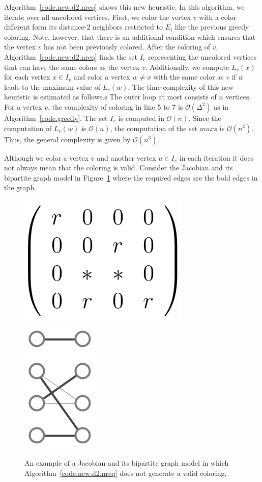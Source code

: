 \documentclass[12pt, twoside,a4paper,toc=bibliography]{scrbook}
\newcommand{\figref}[1]{Figure~\protect\ref{#1}}
\newcommand{\coderef}[1]{Algorithm~\protect\ref{#1}}
\newcommand{\nreq}{L}
\begin{document}
\coderef{code.new.d2.nreq} shows this new heuristic.
In this algorithm, we iterate over all uncolored vertices.
First, we color the vertex $v$ with a color different form
its distance-$2$ neighbors restricted to $E_i$ like the previous greedy coloring.
Note, however, that there is an additional condition which 
ensures that the vertex $v$ has not been previously colored.
After the coloring of $v$, \coderef{code.new.d2.nreq} finds the set $I_v$
representing the uncolored vertices that can have the same colors as the vertex $v$.
Additionally, we compute $\nreq_v(x)$ for each vertex $x\in I_v$
and color a vertex $w\neq x$ with the same color as $v$
if $w$ leads to the maximum value of $\nreq_v(w)$.
The time complexity of this new heuristic is estimated as follows.s
The outer loop at most consists of $n$ vertices. 
For a vertex $v$, the complexity of coloring in line 5 to 7 is $\mathcal{O}(\Delta^2)$ as 
in \coderef{code.greedy}. The set $I_v$ is computed in $\mathcal{O}(n)$.
Since the computation of $\nreq_v(w)$ is $\mathcal{O}(n)$, the computation of
the set $maxs$ is $\mathcal{O}(n^2)$. Thus, the general complexity is given by $\mathcal{O}(n^3)$.

Although we color a vertex $v$ and another vertex $u\in I_v$ in each iteration
it does not always mean that the coloring is valid. Consider the Jacobian and 
its bipartite graph model in \figref{twocolorings2} where the required edges are the bold edges in the graph.
\begin{figure}
\centering
\includegraphics[width=0.25\linewidth]{example_matrix}
\qquad
\includegraphics[width=0.12\linewidth]{example_bipartite}
\caption{An example of a Jacobian and its bipartite graph model
in which \coderef{code.new.d2.nreq} does not generate a valid coloring.}
\label{twocolorings2}
\end{figure}
\end{document}
